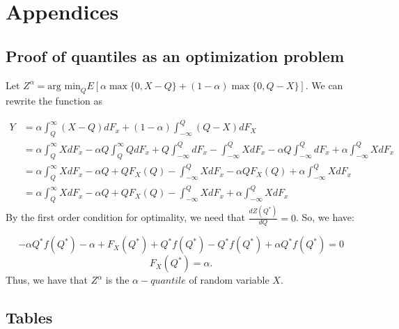 \section{Appendices}
\label{appendice}

\subsection{Proof of quantiles as an optimization problem}
\label{sec:quantile-proof}
Let $Z^{\alpha}=\mbox{arg min}_{Q}E[\alpha\max\{0,X-Q\}+(1-\alpha)\max\{0,Q-X\}].$
We can rewrite the function as

\[
\begin{aligned}Y & =\alpha\int_{Q}^{\infty}(X-Q)dF_{x}+(1-\alpha)\int_{-\infty}^{Q}(Q-X)dF_{X}\\
& =\alpha\int_{Q}^{\infty}XdF_{x}-\alpha Q\int_{Q}^{\infty}QdF_{x}+Q\int_{-\infty}^{Q}dF_{x}-\int_{-\infty}^{Q}XdF_{x}-\alpha Q\int_{-\infty}^{Q}dF_{x}+\alpha\int_{-\infty}^{Q}XdF_{x}\\
& =\alpha\int_{Q}^{\infty}XdF_{x}-\alpha Q+QF_{X}(Q)-\int_{-\infty}^{Q}XdF_{x}-\alpha QF_{X}(Q)+\alpha\int_{-\infty}^{Q}XdF_{x}\\
& =\alpha\int_{Q}^{\infty}XdF_{x}-\alpha Q+QF_{X}(Q)-\int_{-\infty}^{Q}XdF_{x}+\alpha\int_{-\infty}^{Q}XdF_{x}
\end{aligned}
\]
By the first order condition for optimality, we need that $\frac{dZ(Q^{*})}{dQ}=0$.
So, we have:

\[
-\alpha Q^{*}f(Q^{*})-\alpha+F_{X}(Q^{*})+Q^{*}f(Q^{*})-Q^{*}f(Q^{*})+\alpha Q^{*}f(Q^{*})=0
\]
\[
F_{X}(Q^{*})=\alpha.
\]
Thus, we have that $Z^\alpha$ is the $\alpha-quantile$ of random variable $X$.

\subsection{Tables}








